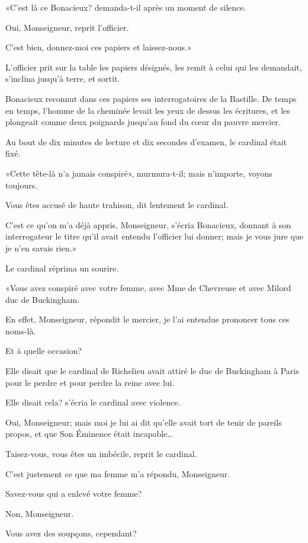 «C'est là ce Bonacieux? demanda-t-il après un moment de silence. 

\speak  Oui, Monseigneur, reprit l'officier. 

\speak  C'est bien, donnez-moi ces papiers et laissez-nous.» 

L'officier prit sur la table les papiers désignés, les remit à celui qui les demandait, s'inclina jusqu'à terre, et sortit. 

Bonacieux reconnut dans ces papiers ses interrogatoires de la Bastille. De temps en temps, l'homme de la cheminée levait les yeux de dessus les écritures, et les plongeait comme deux poignards jusqu'au fond du cœur du pauvre mercier. 

Au bout de dix minutes de lecture et dix secondes d'examen, le cardinal était fixé. 

«Cette tête-là n'a jamais conspiré», murmura-t-il; mais n'importe, voyons toujours. 

\speak  Vous êtes accusé de haute trahison, dit lentement le cardinal. 

\speak  C'est ce qu'on m'a déjà appris, Monseigneur, s'écria Bonacieux, donnant à son interrogateur le titre qu'il avait entendu l'officier lui donner; mais je vous jure que je n'en savais rien.» 

Le cardinal réprima un sourire. 

«Vous avez conspiré avec votre femme, avec Mme de Chevreuse et avec Milord duc de Buckingham. 

\speak  En effet, Monseigneur, répondit le mercier, je l'ai entendue prononcer tous ces noms-là. 

\speak  Et à quelle occasion? 

\speak  Elle disait que le cardinal de Richelieu avait attiré le duc de Buckingham à Paris pour le perdre et pour perdre la reine avec lui. 

\speak  Elle disait cela? s'écria le cardinal avec violence. 

\speak  Oui, Monseigneur; mais moi je lui ai dit qu'elle avait tort de tenir de pareils propos, et que Son Éminence était incapable\dots 

\speak  Taisez-vous, vous êtes un imbécile, reprit le cardinal. 

\speak  C'est justement ce que ma femme m'a répondu, Monseigneur. 

\speak  Savez-vous qui a enlevé votre femme? 

\speak  Non, Monseigneur. 

\speak  Vous avez des soupçons, cependant? 


